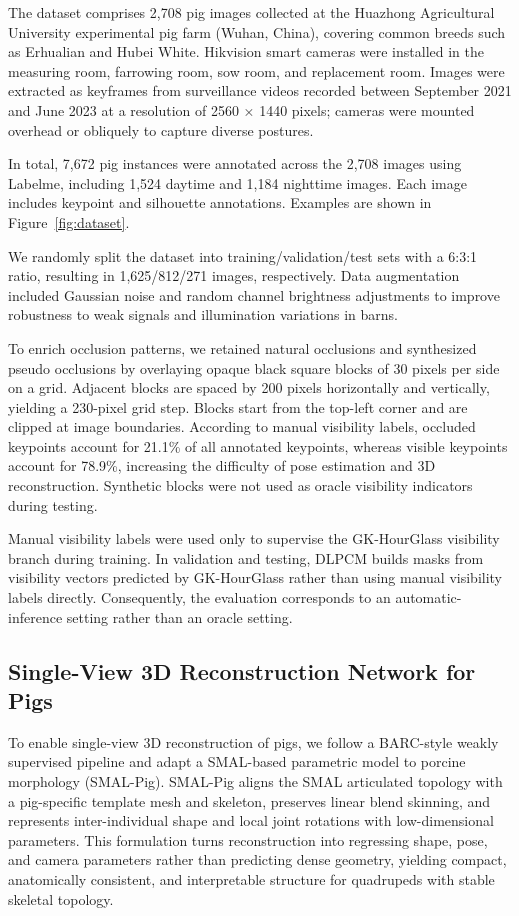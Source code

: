 \documentclass[computers,article,submit,pdftex,moreauthors]{mdpi}
\begin{document}
The dataset comprises 2,708 pig images collected at the Huazhong Agricultural University experimental pig farm (Wuhan, China), covering common breeds such as Erhualian and Hubei White. Hikvision smart cameras were installed in the measuring room, farrowing room, sow room, and replacement room. Images were extracted as keyframes from surveillance videos recorded between September 2021 and June 2023 at a resolution of 2560 × 1440 pixels; cameras were mounted overhead or obliquely to capture diverse postures.

In total, 7,672 pig instances were annotated across the 2,708 images using Labelme, including 1,524 daytime and 1,184 nighttime images. Each image includes keypoint and silhouette annotations. Examples are shown in Figure~\ref{fig:dataset}.

We randomly split the dataset into training/validation/test sets with a 6:3:1 ratio, resulting in 1,625/812/271 images, respectively. Data augmentation included Gaussian noise and random channel brightness adjustments to improve robustness to weak signals and illumination variations in barns.

To enrich occlusion patterns, we retained natural occlusions and synthesized pseudo occlusions by overlaying opaque black square blocks of 30 pixels per side on a grid. Adjacent blocks are spaced by 200 pixels horizontally and vertically, yielding a 230-pixel grid step. Blocks start from the top-left corner and are clipped at image boundaries. According to manual visibility labels, occluded keypoints account for 21.1\% of all annotated keypoints, whereas visible keypoints account for 78.9\%, increasing the difficulty of pose estimation and 3D reconstruction. Synthetic blocks were not used as oracle visibility indicators during testing.

Manual visibility labels were used only to supervise the GK-HourGlass visibility branch during training. In validation and testing, DLPCM builds masks from visibility vectors predicted by GK-HourGlass rather than using manual visibility labels directly. Consequently, the evaluation corresponds to an automatic-inference setting rather than an oracle setting.

\subsection{Single-View 3D Reconstruction Network for Pigs}\label{sec:smal_pig}

To enable single-view 3D reconstruction of pigs, we follow a BARC-style weakly supervised pipeline and adapt a SMAL-based parametric model to porcine morphology (SMAL-Pig). SMAL-Pig aligns the SMAL articulated topology with a pig-specific template mesh and skeleton, preserves linear blend skinning, and represents inter-individual shape and local joint rotations with low-dimensional parameters. This formulation turns reconstruction into regressing shape, pose, and camera parameters rather than predicting dense geometry, yielding compact, anatomically consistent, and interpretable structure for quadrupeds with stable skeletal topology.
\end{document}
